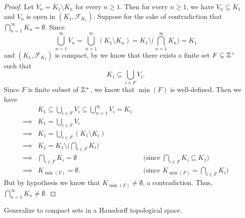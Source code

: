 \begin{proof}
  Let \(V_n = K_1 \setminus K_n\) for every \(n \geq 1\).
  Then for every \(n \geq 1\), we have \(V_n \subseteq K_1\) and \(V_n\) is open in \((K_1, \mathcal{F}_{K_1})\).
  Suppose for the sake of contradiction that \(\bigcap_{n = 1}^\infty K_n = \emptyset\).
  Since
  \[
    \bigcup_{n = 1}^\infty V_n = \bigcup_{n = 1}^\infty (K_1 \setminus K_n) = K_1 \setminus \bigg(\bigcap_{n = 1}^\infty K_n\bigg) = K_1
  \]
  and \((K_1, \mathcal{F}_{K_1})\) is compact, by  we know that there exists a finite set \(F \subseteq \mathbb{Z}^+\) such that
  \[
    K_1 \subseteq \bigcup_{i \in F} V_i.
  \]
  Since \(F\) is finite subset of \(\mathbb{Z}^+\), we know that \(\min(F)\) is well-defined.
  Then we have
  \begin{align*}
             & K_1 \subseteq \bigcup_{i \in F} V_i \subseteq \bigcup_{n = 1}^\infty V_i = K_1                                                             \\
    \implies & K_1 = \bigcup_{i \in F} V_i                                                                                                                \\
    \implies & K_1 = \bigcup_{i \in F} (K_1 \setminus K_i)                                                                                                \\
    \implies & K_1 = K_1 \setminus \bigg(\bigcap_{i \in F} K_i\bigg)                                                                                      \\
    \implies & \bigcap_{i \in F} K_i = \emptyset                                              &  & \text{(since \(\bigcap_{i \in F} K_i \subseteq K_1)\)} \\
    \implies & K_{\min(F)} = \emptyset.                                                       &  & \text{(since \(K_{\min(F)} = \bigcap_{i \in F} K_i)\)}
  \end{align*}
  But by hypothesis we know that \(K_{\min(F)} \neq \emptyset\), a contradiction.
  Thus, \(\bigcap_{n = 1}^\infty K_n \neq \emptyset\).
\end{proof}

\begin{ex}\label{ii:ex:2.5.14}
  Generalize  to compact sets in a Hausdorff topological space.
\end{ex}

